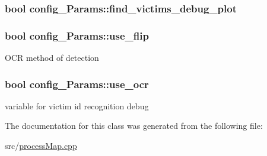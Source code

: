 \subsubsection[{\texorpdfstring{find\+\_\+victims\+\_\+debug\+\_\+plot}{find_victims_debug_plot}}]{\setlength{\rightskip}{0pt plus 5cm}bool config\+\_\+\+Params\+::find\+\_\+victims\+\_\+debug\+\_\+plot}\hypertarget{classconfig__Params_a59864ae7066a22a6f1351fa5c12062c0}{}\label{classconfig__Params_a59864ae7066a22a6f1351fa5c12062c0}
\subsubsection[{\texorpdfstring{use\+\_\+flip}{use_flip}}]{\setlength{\rightskip}{0pt plus 5cm}bool config\+\_\+\+Params\+::use\+\_\+flip}\hypertarget{classconfig__Params_a1d6f37fc963e52c0ab79ee953a0057b4}{}\label{classconfig__Params_a1d6f37fc963e52c0ab79ee953a0057b4}
O\+CR method of detection 
\subsubsection[{\texorpdfstring{use\+\_\+ocr}{use_ocr}}]{\setlength{\rightskip}{0pt plus 5cm}bool config\+\_\+\+Params\+::use\+\_\+ocr}\hypertarget{classconfig__Params_a4229ef753b2a5c50fbe73cf6b91cb9db}{}\label{classconfig__Params_a4229ef753b2a5c50fbe73cf6b91cb9db}
variable for victim id recognition debug 

The documentation for this class was generated from the following file\+:\begin{DoxyCompactItemize}
\item 
src/\hyperlink{processMap_8cpp}{process\+Map.\+cpp}\end{DoxyCompactItemize}
